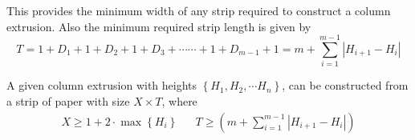 This provides the minimum width of any strip required to construct a column extrusion.
Also the minimum required strip length is given by
$$ T = 1 + D_1  +  1 + D_2  +  1 + D_3  +\cdots\cdots +  1 + D_{m-1}  +  1 = m + \sum^{m-1}_{i=1} \left| H_{i+1}-H_i\right| $$

\begin{theorem}
\label{thm:column_extrusion}
A given column extrusion with heights $\left\{ H_1, H_2,\cdots H_n \right\}$, can be constructed from a strip of paper with size
$X\times T$, where
\begin{align}
X\ge 1 + 2\cdot\max\left\{ H_i\right\} && T \ge \left( m + \sum\limits^{m-1}_{i=1} \left| H_{i+1}-H_i\right|\right)
\end{align}
\end{theorem}



